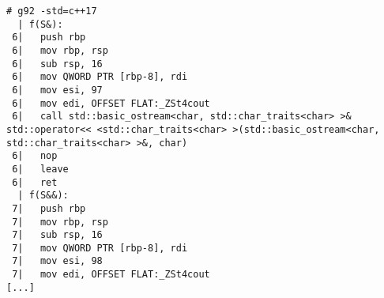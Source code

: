 \begin{lstlisting}[language={},numbers=none,title=\href{https://godbolt.org/z/-DmXgE}{\texttt{godbolt.org/z/-DmXgE}}]
# g92 -std=c++17
  | f(S&):
 6|   push rbp
 6|   mov rbp, rsp
 6|   sub rsp, 16
 6|   mov QWORD PTR [rbp-8], rdi
 6|   mov esi, 97
 6|   mov edi, OFFSET FLAT:_ZSt4cout
 6|   call std::basic_ostream<char, std::char_traits<char> >& std::operator<< <std::char_traits<char> >(std::basic_ostream<char, std::char_traits<char> >&, char)
 6|   nop
 6|   leave
 6|   ret
  | f(S&&):
 7|   push rbp
 7|   mov rbp, rsp
 7|   sub rsp, 16
 7|   mov QWORD PTR [rbp-8], rdi
 7|   mov esi, 98
 7|   mov edi, OFFSET FLAT:_ZSt4cout
[...]
\end{lstlisting}
